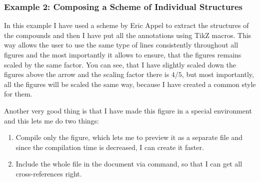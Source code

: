 \documentclass[
]{scrartcl}
\begin{document}
%
\clearpage
\subsubsection{Example 2: Composing a Scheme of Individual Structures}

%
In this example I have used a scheme by Eric Appel to extract the structures of
    the compounds and then I have put all the annotations using TikZ macros.
%
This way allows the user to use the same type of lines consistently throughout
    all figures and the most importantly it allows to ensure, that the figures
    remains scaled by the same factor.
%
You can see, that I have slightly scaled down the figures above the arrow and
    the scaling factor there is $4/5$, but most importantly, all the figures
    will be scaled the same way, because I have created a common style for them.

%
Another very good thing is that I have made this figure in a special
 environment and this lets me do two things:
\begin{enumerate}
    \item
        Compile only the figure, which lets me to preview it as a separate
             file and since the compilation time is decreased, I can
            create it faster.
    \item
        Include the whole  file in the document via 
            command, so that I can get all cross-references right.
\end{enumerate}
\end{document}
